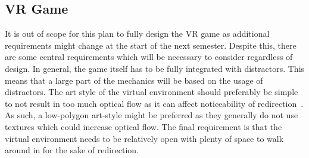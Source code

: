 \subsection{VR Game}
It is out of scope for this plan to fully design the VR game as additional requirements might change at the start of the next semester. Despite this, there are some central requirements which will be necessary to consider regardless of design. In general, the game itself has to be fully integrated with distractors. This means that a large part of the mechanics will be based on the usage of distractors. The art style of the virtual environment should preferably be simple to not result in too much optical flow as it can affect noticeability of redirection~\cite{8446225, steinicke2008moving, 8446216}. As such, a low-polygon art-style might be preferred as they generally do not use textures which could increase optical flow. The final requirement is that the virtual environment needs to be relatively open with plenty of space to walk around in for the sake of redirection.
